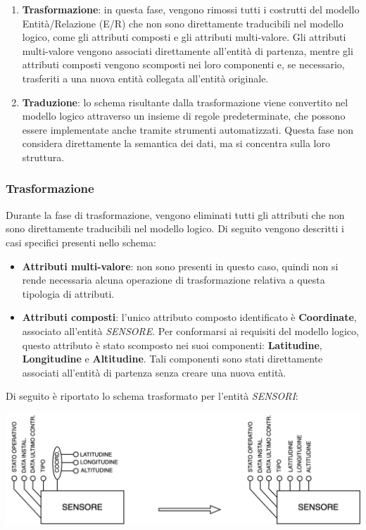 \documentclass{article}
\begin{document}
\begin{enumerate}
    \item \textbf{Trasformazione}: in questa fase, vengono rimossi tutti i costrutti del modello Entità/Relazione (E/R) che non sono direttamente traducibili nel modello logico, come gli attributi composti e gli attributi multi-valore. Gli attributi multi-valore vengono associati direttamente all’entità di partenza, mentre gli attributi composti vengono scomposti nei loro componenti e, se necessario, trasferiti a una nuova entità collegata all’entità originale.
    \item \textbf{Traduzione}: lo schema risultante dalla trasformazione viene convertito nel modello logico attraverso un insieme di regole predeterminate, che possono essere implementate anche tramite strumenti automatizzati. Questa fase non considera direttamente la semantica dei dati, ma si concentra sulla loro struttura.
\end{enumerate}

\subsubsection{Trasformazione}

Durante la fase di trasformazione, vengono eliminati tutti gli attributi che non sono direttamente traducibili nel modello logico. Di seguito vengono descritti i casi specifici presenti nello schema:

\begin{itemize}
    \item \textbf{Attributi multi-valore}: non sono presenti in questo caso, quindi non si rende necessaria alcuna operazione di trasformazione relativa a questa tipologia di attributi.
    \item \textbf{Attributi composti}: l'unico attributo composto identificato è \textbf{Coordinate}, associato all'entità \textit{SENSORE}. Per conformarsi ai requisiti del modello logico, questo attributo è stato scomposto nei suoi componenti: \textbf{Latitudine}, \textbf{Longitudine} e \textbf{Altitudine}. Tali componenti sono stati direttamente associati all’entità di partenza senza creare una nuova entità.
\end{itemize}

Di seguito è riportato lo schema trasformato per l'entità \textit{SENSORI}:

\includegraphics[width=\textwidth]{Media/Trasformazione_Sensore.png}
\end{document}
